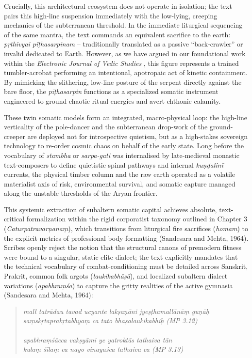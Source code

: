 \documentclass[11pt,twoside,letterpaper]{article}
\begin{document}
Crucially, this architectural ecosystem does not operate in isolation; the text pairs this high-line suspension immediately with the low-lying, creeping mechanics of the subterranean threshold. In the immediate liturgical sequencing of the same mantra, the text commands an equivalent sacrifice to the earth: \textit{pṛthivyai pīṭhasarpinam} -- traditionally translated as a passive ``back-crawler'' or invalid dedicated to Earth. However, as we have argued in our foundational work within the \textit{Electronic Journal of Vedic Studies} \cite{mccartney2025}, this figure represents a trained tumbler-acrobat performing an intentional, apotropaic act of kinetic containment. By mimicking the slithering, low-line posture of the serpent directly against the bare floor, the \textit{pīṭhasarpin} functions as a specialized somatic instrument engineered to ground chaotic ritual energies and avert chthonic calamity. 

These twin somatic models form an integrated, macro-physical loop: the high-line verticality of the pole-dancer and the subterranean drop-work of the ground-creeper are deployed not for introspective quietism, but as a high-stakes sovereign technology to re-order cosmic chaos on behalf of the early state. Long before the vocabulary of \textit{stambha} or \textit{sarpa-gati} was internalised by late-medieval monastic text-composers to define quietistic spinal pathways and internal \textit{kuṇḍalinī} currents, the physical timber column and the raw earth operated as a volatile materialist axis of risk, environmental survival, and somatic capture managed along the unstable thresholds of the Aryan frontier.

This systemic extraction of subaltern somatic capital achieves absolute, text-critical formalization within the rigid corporatist taxonomy outlined in Chapter 3 (\textit{Caturpātravarṇanaṃ}), which transitions from liturgical fire sacrifices (\textit{homam}) to the explicit metrics of professional body formatting (Sandesara and Mehta, 1964). Scribes openly reject the notion that the structural canons of premodern fitness were bound to a singular, static elite dialect; the text explicitly mandates that the technical vocabulary of combat-conditioning must be detailed across Sanskrit, Prakrit, common folk argots (\textit{laukikabhāṣā}), and localized subaltern dialect variations (\textit{apabhraṃśa}) to capture the gritty realities of the active gymnasia (Sandesara and Mehta, 1964):

\begin{quote}
\textit{mall tatrādau tavad ucyante lakṣaṇāni jyeṣṭhamallānāṃ guṇāḥ }\\
\textit{saṃskṛtaprakṛtābhyāṃ ca tato bhāṣālaukikābhiḥ (MP 3.12)} \\
\\
\textit{apabhraṃśācca vakṣyāmi ye yatroktās tathaiva tān }\\ 
\textit{kulaṃ śīlaṃ ca nayo vinayaśca tathaiva ca (MP 3.13)}
\end{quote}
\end{document}
